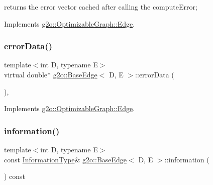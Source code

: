 returns the error vector cached after calling the compute\+Error; 



Implements \mbox{\hyperlink{classg2o_1_1_optimizable_graph_1_1_edge_a5f2a4b6efa2d0ae600f94a28a6ba58cf}{g2o\+::\+Optimizable\+Graph\+::\+Edge}}.

\mbox{\label{classg2o_1_1_base_edge_ab80452c1134036928a2af6303412a3c4}} 
\subsubsection{\texorpdfstring{error\+Data()}{errorData()}\hspace{0.1cm}{\footnotesize\ttfamily [2/2]}}
{\footnotesize\ttfamily template$<$int D, typename E$>$ \\
virtual double$\ast$ \mbox{\hyperlink{classg2o_1_1_base_edge}{g2o\+::\+Base\+Edge}}$<$ D, E $>$\+::error\+Data (\begin{DoxyParamCaption}{ }\end{DoxyParamCaption})\hspace{0.3cm}{\ttfamily [inline]}, {\ttfamily [virtual]}}



Implements \mbox{\hyperlink{classg2o_1_1_optimizable_graph_1_1_edge_a460a0cb0256b0a91edb131e25181f57b}{g2o\+::\+Optimizable\+Graph\+::\+Edge}}.

\mbox{\label{classg2o_1_1_base_edge_a405f8d52738e557a0860b52ac67a005b}} 
\subsubsection{\texorpdfstring{information()}{information()}\hspace{0.1cm}{\footnotesize\ttfamily [1/2]}}
{\footnotesize\ttfamily template$<$int D, typename E$>$ \\
const \mbox{\hyperlink{classg2o_1_1_base_edge_a2e5a33343ac3f189d8a7d5ee4d8b73fc}{Information\+Type}}\& \mbox{\hyperlink{classg2o_1_1_base_edge}{g2o\+::\+Base\+Edge}}$<$ D, E $>$\+::information (\begin{DoxyParamCaption}{ }\end{DoxyParamCaption}) const\hspace{0.3cm}{\ttfamily [inline]}}



